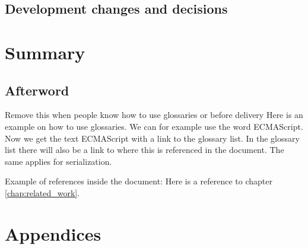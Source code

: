 \documentclass[BSP,english,oneside]{classes/gucthesis}
\newcommand{\comment}[1]{\textcolor{blue}{\emph{#1}}}
\newcommand{\todo}[1]{{\color{green}#1}}
\begin{document}
	\chapter{Development changes and decisions}
		\label{chap:Developmentchangesanddecisions}
		


\part{Summary}

	\chapter{Afterword}
		\label{chap:afterword}
		


\todo{Remove this when people know how to use glossaries or before delivery}
Here is an example on how to use glossaries. We can for example use the word
\gls{ECMAScript}. Now we get the text ECMAScript with a link to the glossary
list. In the glossary list there will also be a link to where this is 
referenced in the document. The same applies for \gls{serialization}.

Example of references inside the document:
	Here is a reference to chapter \ref{chap:related_work}.







\printnoidxglossary[sort=word]


\part{Appendices}

\appendix %

% 

% 

% 


\end{document}
